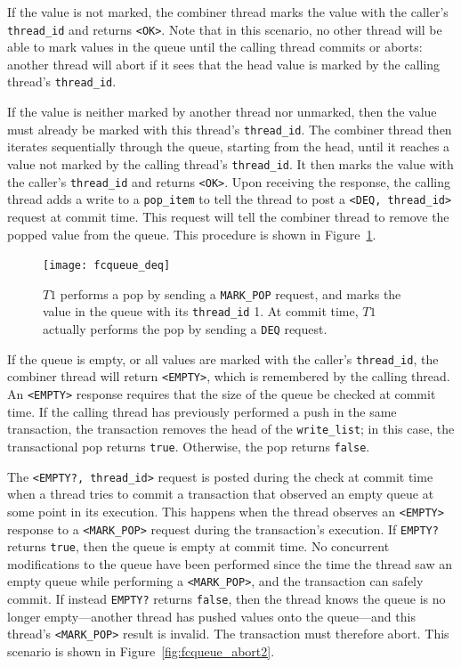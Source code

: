 If the value is not marked, the combiner thread marks the value with the caller's \texttt{thread\_id} and returns \texttt{<OK>}. Note that in this scenario, no other thread will be able to mark values in the queue until the calling thread commits or aborts: another thread will abort if it sees that the head value is marked by the calling thread's \texttt{thread\_id}. 

If the value is neither marked by another thread nor unmarked, then the value must already be marked with this thread's \texttt{thread\_id}. The combiner thread then iterates sequentially through the queue, starting from the head, until it reaches a value not marked by the calling thread's \texttt{thread\_id}. It then marks the value with the caller's \texttt{thread\_id} and returns \texttt{<OK>}. Upon receiving the response, the calling thread adds a write to a \texttt{pop\_item} to tell the thread to post a \texttt{<DEQ, thread\_id>} request at commit time. This request will tell the combiner thread to remove the popped value from the queue. This procedure is shown in Figure~\ref{fig:fcqueue_deq}.

\begin{figure}[t]
\centering
\texttt{[image: fcqueue\_deq]}
    \caption[Transactional flat combining pop request execution]{$T1$ performs a pop by sending a \texttt{MARK\_POP} request, and marks the value in the queue with its \texttt{thread\_id} 1. At commit time, $T1$ actually performs the pop by sending a \texttt{DEQ} request.} 
\label{fig:fcqueue_deq}
\end{figure}

If the queue is empty, or all values are marked with the caller's \texttt{thread\_id}, the combiner thread will return \texttt{<EMPTY>}, which is remembered by the calling thread. An \texttt{<EMPTY>} response requires that the size of the queue be checked at commit time. If the calling thread has previously performed a push in the same transaction, the transaction removes the head of the \texttt{write\_list}; in this case, the transactional pop returns \texttt{true}. Otherwise, the pop returns \texttt{false}.

The \texttt{<EMPTY?, thread\_id>} request is posted during the check at commit time when a thread tries to commit a transaction that observed an empty queue at some point in its execution. This happens when the thread observes an \texttt{<EMPTY>} response to a \texttt{<MARK\_POP>} request during the transaction's execution. If \texttt{EMPTY?} returns \texttt{true}, then the queue is empty at commit time. No concurrent modifications to the queue have been performed since the time the thread saw an empty queue while performing a \texttt{<MARK\_POP>}, and the transaction can safely commit. If instead \texttt{EMPTY?} returns \texttt{false}, then the thread knows the queue is no longer empty---another thread has pushed values onto the queue---and this thread's \texttt{<MARK\_POP>} result is invalid. The transaction must therefore abort. This scenario is shown in Figure~\ref{fig:fcqueue_abort2}.


